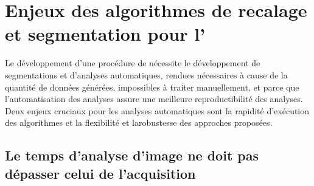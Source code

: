 \documentclass[\main/main.tex]{subfiles}
\begin{document}
            
\section{Enjeux des algorithmes de recalage et segmentation pour l'\hca{}}

%
Le développement d'une procédure de \hca{} nécessite le développement de segmentations et d'analyses automatiques, rendues nécessaires à cause de la quantité de données générées, impossibles à traiter manuellement, et parce que l'automatisation des analyses assure une meilleure reproductibilité des analyses.
Deux enjeux cruciaux pour les analyses automatiques sont la rapidité d'exécution des algorithmes et la flexibilité et larobustesse des approches proposées.

    \subsection{Le temps d'analyse d'image ne doit pas dépasser celui de l'acquisition}
\end{document}
